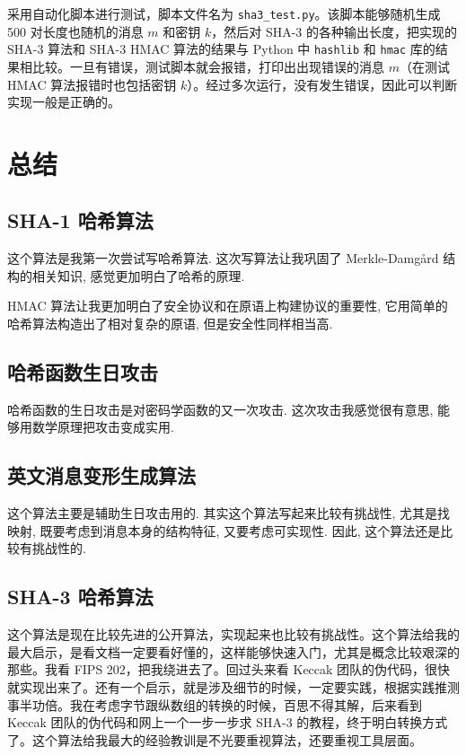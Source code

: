 \documentclass[12pt,a4paper]{article}
\begin{document}
采用自动化脚本进行测试，脚本文件名为 \texttt{sha3\_test.py}。该脚本能够随机生成 500 对长度也随机的消息 $ m $ 和密钥 $ k $，然后对 SHA-3 的各种输出长度，把实现的 SHA-3 算法和 SHA-3 HMAC 算法的结果与 Python 中 \texttt{hashlib} 和 \texttt{hmac} 库的结果相比较。一旦有错误，测试脚本就会报错，打印出出现错误的消息 $ m $（在测试 HMAC 算法报错时也包括密钥 $ k $）。经过多次运行，没有发生错误，因此可以判断实现一般是正确的。

\section*{总结}

\subsection*{SHA-1 哈希算法}

这个算法是我第一次尝试写哈希算法. 这次写算法让我巩固了 Merkle-Damgård 结构的相关知识, 感觉更加明白了哈希的原理. 

HMAC 算法让我更加明白了安全协议和在原语上构建协议的重要性, 它用简单的哈希算法构造出了相对复杂的原语, 但是安全性同样相当高. 

\subsection*{哈希函数生日攻击}

哈希函数的生日攻击是对密码学函数的又一次攻击. 这次攻击我感觉很有意思, 能够用数学原理把攻击变成实用. 
　　
\subsection*{英文消息变形生成算法}

这个算法主要是辅助生日攻击用的. 其实这个算法写起来比较有挑战性, 尤其是找映射, 既要考虑到消息本身的结构特征, 又要考虑可实现性. 因此, 这个算法还是比较有挑战性的. 

\subsection*{SHA-3 哈希算法}

这个算法是现在比较先进的公开算法，实现起来也比较有挑战性。这个算法给我的最大启示，是看文档一定要看好懂的，这样能够快速入门，尤其是概念比较艰深的那些。我看 FIPS 202，把我绕进去了。回过头来看 Keccak 团队的伪代码，很快就实现出来了。还有一个启示，就是涉及细节的时候，一定要实践，根据实践推测事半功倍。我在考虑字节跟纵数组的转换的时候，百思不得其解，后来看到 Keccak 团队的伪代码和网上一个一步一步求 SHA-3 的教程，终于明白转换方式了。这个算法给我最大的经验教训是不光要重视算法，还要重视工具层面。
\end{document}
